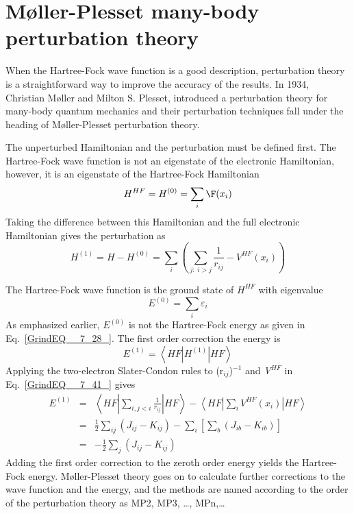 \documentclass[11pt,oneside,final]{huthesis}%
\begin{document}
\section{M{\o}ller-Plesset many-body perturbation {theory}}

When the Hartree-Fock wave function is a good description, perturbation theory is a straightforward way to improve the accuracy of the results.  In 1934, Christian M{\o}ller and Milton S. Plesset, introduced a perturbation theory for many-body quantum mechanics and their perturbation techniques fall under the heading of M{\o}ller-Plesset perturbation theory. 

The unperturbed Hamiltonian and the perturbation must be defined first.  The Hartree-Fock wave function is not an eigenstate of the electronic Hamiltonian, however, it is an eigenstate of the Hartree-Fock Hamiltonian
\begin{equation} \label{GrindEQ__7_39_} 
H^{HF} =H^{(0)} =\sum_{i}\F(x_{i} )  
\end{equation} 
Taking the difference between this Hamiltonian and the full electronic Hamiltonian gives the perturbation as 
\begin{equation} \label{GrindEQ__7_40_} 
H^{(1)} =H-H^{(0)} =\sum _{i}\left(\sum _{j:\; i>j}\frac{1}{r_{ij} }  -V^{HF} (x_{i} )\right)  
\end{equation} 


The Hartree-Fock wave function is the ground state of $H^{HF} $ with eigenvalue 
\begin{equation*}%
E^{(0)} =\sum _{i}\varepsilon _{i}   
\end{equation*} 
As emphasized earlier, ${E}^{(0)}$ is not the Hartree-Fock energy  as given in Eq.~\eqref{GrindEQ__7_28_}.  The first order correction the energy is
\begin{equation} \label{GrindEQ__7_41_} 
E^{(1)} =\left\langle HF|H^{(1)} |HF\right\rangle  
\end{equation} 
Applying the two-electron Slater-Condon rules to (r${}_{ij}$)${}^{-1 }$ and \textit{V}${}^{HF}$ in Eq.~\eqref{GrindEQ__7_41_} gives
\begin{eqnarray} \label{GrindEQ__7_42_} 
E^{(1)} &=& \left\langle HF\left|\sum _{i,j<i}\frac{1}{r_{ij} }  \right|HF\right\rangle  -\left\langle HF\left|\sum _{i}V^{HF} (x_{i} ) \right|HF\right\rangle  \\
 &=& \frac{1}{2} \sum _{ij}(J_{ij} -K_{ij} ) -\sum _{i}\left[\sum _{b}(J_{ib} -K_{ib} ) \right]  \\
 &=& -\frac{1}{2} \sum _{j}(J_{ij} -K_{ij} ) 
\end{eqnarray} 
Adding the first order correction to the zeroth order energy yields the Hartree-Fock energy.  M{\o}ller-Plesset theory goes on to calculate further corrections to the wave function and the energy, and the methods are named according to the order of the perturbation theory as MP2, MP3, \dots, MPn,\dots   
\end{document}
